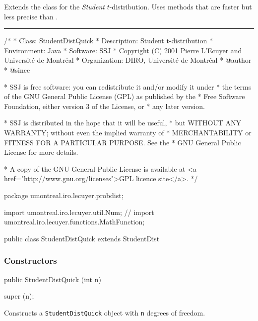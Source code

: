 
Extends the class  for
the \emph{Student} $t$-distribution. Uses methods that are faster but less precise
than .


\bigskip\hrule

\begin{code}
\begin{hide}
/*
 * Class:        StudentDistQuick
 * Description:  Student t-distribution
 * Environment:  Java
 * Software:     SSJ 
 * Copyright (C) 2001  Pierre L'Ecuyer and Université de Montréal
 * Organization: DIRO, Université de Montréal
 * @author       
 * @since

 * SSJ is free software: you can redistribute it and/or modify it under
 * the terms of the GNU General Public License (GPL) as published by the
 * Free Software Foundation, either version 3 of the License, or
 * any later version.

 * SSJ is distributed in the hope that it will be useful,
 * but WITHOUT ANY WARRANTY; without even the implied warranty of
 * MERCHANTABILITY or FITNESS FOR A PARTICULAR PURPOSE.  See the
 * GNU General Public License for more details.

 * A copy of the GNU General Public License is available at
   <a href="http://www.gnu.org/licenses">GPL licence site</a>.
 */
\end{hide}
package umontreal.iro.lecuyer.probdist;
\begin{hide}
import umontreal.iro.lecuyer.util.Num;
// import umontreal.iro.lecuyer.functions.MathFunction;
\end{hide}

public class StudentDistQuick extends StudentDist\begin{hide} {
    private static final int STUDENT_N1 = 20;
    private static final double STUDENT_X1 = 8.01;
    private static final int STUDENT_KMAX = 200;
    private static final double STUDENT_EPS = 0.5E-16;
\end{hide}\end{code}

\subsubsection* {Constructors}

\begin{code}

   public StudentDistQuick (int n)\begin{hide} {
      super (n);
   }\end{hide}
\end{code}
\begin{tabb} Constructs a \texttt{StudentDistQuick} object with \texttt{n} degrees of freedom.
\end{tabb}

